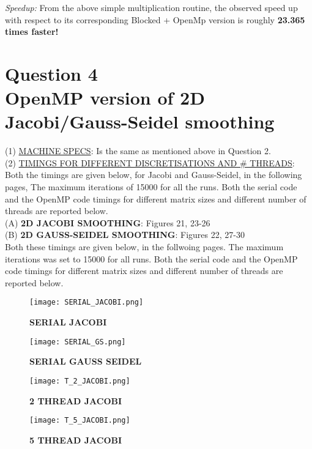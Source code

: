 \documentclass{article}
\begin{document}
\noindent \textit{Speedup:} From the above simple multiplication routine, the observed speed up with respect to its corresponding Blocked + OpenMp version is roughly \textbf {23.365 times faster!}

\section*{Question 4\\ OpenMP version of 2D Jacobi/Gauss-Seidel smoothing}
\vspace{0.5cm}
 (1) \underline{MACHINE SPECS}: Is the same as mentioned above in Question 2.\\
 
 \noindent (2) \underline{TIMINGS FOR DIFFERENT DISCRETISATIONS AND # THREADS}:\\
 
 \noindent Both the timings are given below, for Jacobi and Gauss-Seidel, in the following pages,  The maximum iterations of 15000 for all the runs. Both the serial code and the OpenMP code timings for different matrix sizes and different number of threads are reported below.\\
 
\noindent(A) \textbf{2D JACOBI SMOOTHING}: Figures 21, 23-26\\

 \noindent (B) \textbf{2D GAUSS-SEIDEL SMOOTHING}: Figures 22, 27-30\\
 
  \noindent Both these timings are given below, in the follwoing pages. The maximum iterations was set to 15000 for all runs. Both the serial code and the OpenMP code timings for different matrix sizes and different number of threads are reported below.\\
  

\begin{figure}[htpb!]
     \centering

    \texttt{[image: SERIAL\_JACOBI.png]}
    \caption{ \textbf{SERIAL JACOBI}}

        \texttt{[image: SERIAL\_GS.png]}
    \caption{ \textbf{SERIAL GAUSS SEIDEL}}
  \end{figure} 

\newpage

\begin{figure}[htpb!]
     \centering

    \texttt{[image: T\_2\_JACOBI.png]}
    \caption{ \textbf{2 THREAD JACOBI}}

        \texttt{[image: T\_5\_JACOBI.png]}
    \caption{ \textbf{5 THREAD JACOBI}}
  \end{figure} 
\end{document}
